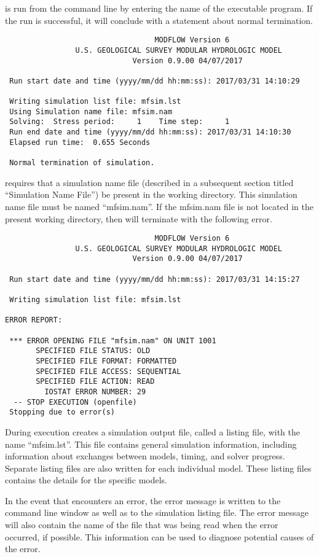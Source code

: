 \mf is run from the command line by entering the name of the \mf executable program.  If the run is successful, it will conclude with a statement about normal termination.

{\small
\begin{verbatim}
                                  MODFLOW Version 6
                U.S. GEOLOGICAL SURVEY MODULAR HYDROLOGIC MODEL
                             Version 0.9.00 04/07/2017

 Run start date and time (yyyy/mm/dd hh:mm:ss): 2017/03/31 14:10:29

 Writing simulation list file: mfsim.lst
 Using Simulation name file: mfsim.nam
 Solving:  Stress period:     1    Time step:     1
 Run end date and time (yyyy/mm/dd hh:mm:ss): 2017/03/31 14:10:30
 Elapsed run time:  0.655 Seconds

 Normal termination of simulation.
\end{verbatim}
}

\noindent \mf requires that a simulation name file (described in a subsequent section titled ``Simulation Name File'') be present in the working directory.  This simulation name file must be named ``mfsim.nam''.  If the mfsim.nam file is not located in the present working directory, then \mf will terminate with the following error.  

{\small
\begin{verbatim}
                                  MODFLOW Version 6
                U.S. GEOLOGICAL SURVEY MODULAR HYDROLOGIC MODEL
                             Version 0.9.00 04/07/2017

 Run start date and time (yyyy/mm/dd hh:mm:ss): 2017/03/31 14:15:27

 Writing simulation list file: mfsim.lst

ERROR REPORT:

 *** ERROR OPENING FILE "mfsim.nam" ON UNIT 1001
       SPECIFIED FILE STATUS: OLD
       SPECIFIED FILE FORMAT: FORMATTED
       SPECIFIED FILE ACCESS: SEQUENTIAL
       SPECIFIED FILE ACTION: READ
         IOSTAT ERROR NUMBER: 29
  -- STOP EXECUTION (openfile)
 Stopping due to error(s)
\end{verbatim}
}

During execution \mf creates a simulation output file, called a listing file, with the name ``mfsim.lst''.  This file contains general simulation information, including information about exchanges between models, timing, and solver progress.  Separate listing files are also written for each individual model.  These listing files contains the details for the specific models.

In the event that \mf encounters an error, the error message is written to the command line window as well as to the simulation listing file.  The error message will also contain the name of the file that was being read when the error occurred, if possible.  This information can be used to diagnose potential causes of the error.  
